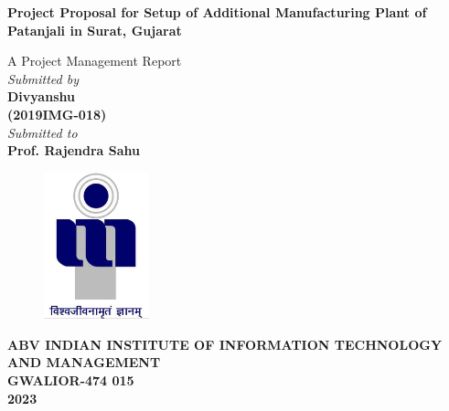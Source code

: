\title{}
\author{}
\thispagestyle{empty}

\begin{titlepage}
\begin{center}
{\LARGE \bf Project Proposal for Setup of Additional Manufacturing Plant of Patanjali in Surat, Gujarat} \\
\end{center}
\begin{center}
\vspace{0.6in}
{\LARGE A Project Management Report} \\
\vspace{0.6in}
{\large \it Submitted by\\\vspace{0.1in}}
{\large \bf \vspace{0.2in}Divyanshu\\(2019IMG-018)\\}
\vspace{0.6in}
{\large \it Submitted to\\}
\vspace{0.1in}
{\large \bf Prof. Rajendra Sahu}\\
\end {center}
\vspace{0.5in}
\begin{figure}[h]
\centerline{\includegraphics[width=1.2in]{./iiitm}}
\end{figure}
\begin{center}
{\Large \bf ABV INDIAN INSTITUTE OF INFORMATION TECHNOLOGY AND MANAGEMENT\\
GWALIOR-474 015\\}
\vspace{0.2in}
{\Large \bf 2023\\}
\end{center}
\end{titlepage}
